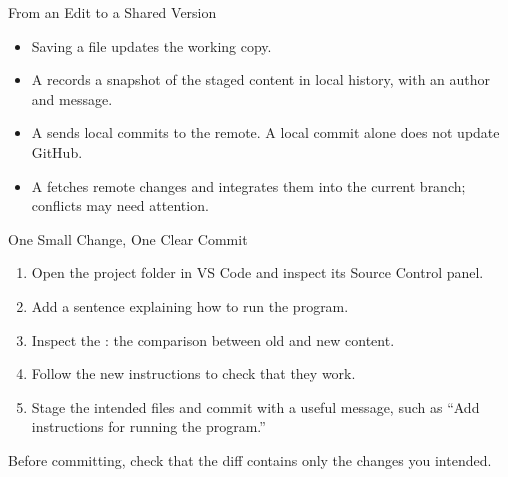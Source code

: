 \begin{frame}{From an Edit to a Shared Version}
\centering
{}
\medskip
\begin{itemize}
\item Saving a file updates the working copy.
\item A  records a snapshot of the staged content in local history, with an author and message.
\item A  sends local commits to the remote. A local commit alone does not update GitHub.
\item A  fetches remote changes and integrates them into the current branch; conflicts may need attention.
\end{itemize}
\end{frame}

\begin{frame}{One Small Change, One Clear Commit}
\par
\begin{enumerate}
\item Open the project folder in VS Code and inspect its Source Control panel.
\item Add a sentence explaining how to run the program.
\item Inspect the : the comparison between old and new content.
\item Follow the new instructions to check that they work.
\item Stage the intended files and commit with a useful message, such as ``Add instructions for running the program.''
\end{enumerate}
\medskip
Before committing, check that the diff contains only the changes you intended.
\end{frame}

